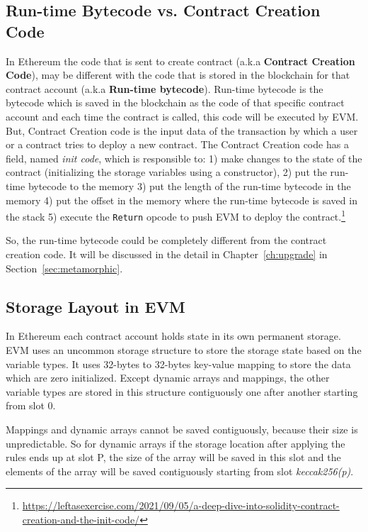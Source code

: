 \subsection{Run-time Bytecode vs. Contract Creation Code}
In Ethereum the code that is sent to create contract (a.k.a \textbf{Contract Creation Code}), may be different with the code that is stored in the blockchain for that contract account (a.k.a \textbf{Run-time bytecode}). Run-time bytecode is the bytecode which is saved in the blockchain as the code of that specific contract account and each time the contract is called, this code will be executed by EVM. But, Contract Creation code is the input data of the transaction by which a user or a contract tries to deploy a new contract. The Contract Creation code has a field, named \textit{init code}, which is responsible to: 1) make changes to the state of the contract (initializing the storage variables using a constructor), 2) put the run-time bytecode to the memory 3) put the length of the run-time bytecode in the memory 4) put the offset in the memory where the run-time bytecode is saved in the stack 5) execute the \texttt{Return} opcode to push EVM to deploy the contract.\footnote{\url{https://leftasexercise.com/2021/09/05/a-deep-dive-into-solidity-contract-creation-and-the-init-code/}} 

So, the run-time bytecode could be completely different from the contract creation code. It will be discussed in the detail in Chapter~\ref{ch:upgrade} in Section~\ref{sec:metamorphic}.

\subsection{Storage Layout in EVM} \label{sec:storagelayout}
In Ethereum each contract account holds state in its own permanent storage. EVM uses an uncommon storage structure to store the storage state based on the variable types. It uses 32-bytes to 32-bytes key-value mapping to store the data which are zero initialized. Except dynamic arrays and mappings, the other variable types are stored in this structure contiguously one after another starting from slot 0. 

Mappings and dynamic arrays cannot be saved contiguously, because their size is unpredictable. So for dynamic arrays if the storage location after applying the rules ends up at slot P, the size of the array will be saved in this slot and the elements of the array will be saved contiguously starting from slot \textit{keccak256(p)}.


